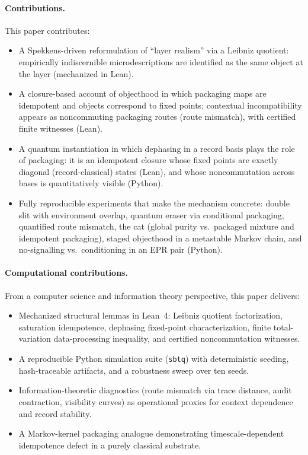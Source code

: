 \documentclass[11pt]{article}
\begin{document}
\paragraph{Contributions.}
This paper contributes:
\begin{itemize}
  \item A Spekkens-driven reformulation of ``layer realism'' via a Leibniz quotient: empirically indiscernible microdescriptions are identified as the same object at the layer (mechanized in Lean).
  \item A closure-based account of objecthood in which packaging maps are idempotent and objects correspond to fixed points; contextual incompatibility appears as noncommuting packaging routes (route mismatch), with certified finite witnesses (Lean).
  \item A quantum instantiation in which dephasing in a record basis plays the role of packaging: it is an idempotent closure whose fixed points are exactly diagonal (record-classical) states (Lean), and whose noncommutation across bases is quantitatively visible (Python).
  \item Fully reproducible experiments that make the mechanism concrete: double slit with environment overlap, quantum eraser via conditional packaging, quantified route mismatch, the cat (global purity vs.\ packaged mixture and idempotent packaging), staged objecthood in a metastable Markov chain, and no-signalling vs.\ conditioning in an EPR pair (Python).
\end{itemize}

\paragraph{Computational contributions.}
From a computer science and information theory perspective, this paper delivers:
\begin{itemize}
  \item Mechanized structural lemmas in Lean~4: Leibniz quotient factorization, saturation idempotence, dephasing fixed-point characterization, finite total-variation data-processing inequality, and certified noncommutation witnesses.
  \item A reproducible Python simulation suite (\texttt{sbtq}) with deterministic seeding, hash-traceable artifacts, and a robustness sweep over ten seeds.
  \item Information-theoretic diagnostics (route mismatch via trace distance, audit contraction, visibility curves) as operational proxies for context dependence and record stability.
  \item A Markov-kernel packaging analogue demonstrating timescale-dependent idempotence defect in a purely classical substrate.
\end{itemize}
\end{document}
